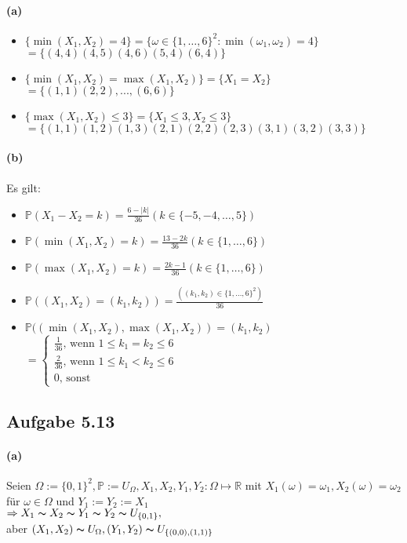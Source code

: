 \documentclass[10pt, a4paper]{article}
\begin{document}
\paragraph{(a)}
\begin{itemize}
	\item[] $\{\min(X_{1},X_{2})=4 \}=\{\omega\in\{1,\dots,6 \}^{2}:\min(\omega_{1},\omega_{2})=4\}$
	$=\{(4,4)(4,5)(4,6)(5,4)(6,4) \}$
	\item[] $\{\min(X_{1},X_{2})=\max(X_{1},X_{2}) \}=\{X_{1}=X_{2}\}$
	$=\{(1,1)(2,2),...,(6,6) \}$
	\item[] $\{\max(X_{1},X_{2})\leq3 \}=\{X_{1}\leq3,X_{2}\leq3\}$
	$=\{(1,1)(1,2)(1,3)(2,1)(2,2)(2,3)(3,1)(3,2)(3,3) \}$
\end{itemize}


\paragraph{(b)}
Es gilt:
\begin{itemize}
	\item[] $\mathbb{P}(X_{1}-X_{2}=k)=\frac{6-|k|}{36}(k\in\{-5,-4,\dots,5\})$
	\item[] $\mathbb{P}(\min(X_{1},X_{2})=k)=\frac{13-2k}{36}(k\in\{1,\dots,6\})$
	\item[] $\mathbb{P}(\max(X_{1},X_{2})=k)=\frac{2k-1}{36}(k\in\{1,\dots,6 \})$
	\item[] $\mathbb{P}((X_{1},X_{2})=(k_{1},k_{2}))=\frac{((k_{1},k_{2})\in\{1,\dots,6\}^{2})}{36}$
	\item[] $\mathbb{P}((\min(X_{1},X_{2}),\max(X_{1},X_{2}))=(k_{1},k_{2})$
	$=\begin{cases}
	\frac{1}{36}\text{, wenn } 1\leq k_{1}= k_{2}\leq6	\\
	\frac{2}{36}\text{, wenn } 1\leq k_{1}< k_{2}\leq6	\\
	0 \text{, sonst}
	\end{cases}$
\end{itemize}



\subsection{Aufgabe 5.13}
\paragraph{(a)}
Seien $\Omega:=\{0,1 \}^{2}, \mathbb{P}:=U_{\Omega}, X_{1},X_{2},Y_{1},Y_{2}:\Omega\mapsto\mathbb{R}$ mit $X_{1}(\omega)=\omega_{1},X_{2}(\omega)=\omega_{2}$ für $\omega\in\Omega$ und $Y_{1}:=Y_{2}:=X_{1}$	\\
$\Rightarrow X_{1}\thicksim X_{2}\thicksim Y_{1}\thicksim Y_{2}\thicksim U_{\{0,1\}},$	\\
aber $(X_{1},X_{2})\thicksim U_{\Omega}, (Y_{1},Y_{2})\thicksim U_{\{(0,0),(1,1)\}} $
\end{document}
